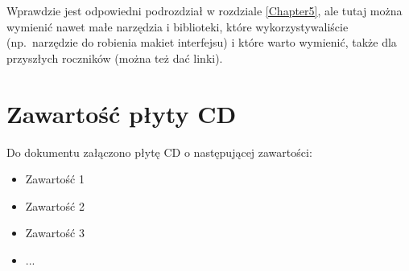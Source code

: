 Wprawdzie jest odpowiedni podrozdział w rozdziale \ref{Chapter5}, ale tutaj można wymienić nawet małe narzędzia i biblioteki, które wykorzystywaliście (np.~narzędzie do robienia makiet interfejsu) i które warto wymienić, także dla przyszłych roczników (można też dać linki).

\section{Zawartość płyty CD}

Do dokumentu załączono płytę CD o następującej zawartości:

\begin{itemize}
\item Zawartość 1
\item Zawartość 2
\item Zawartość 3
\item ...
\end{itemize}